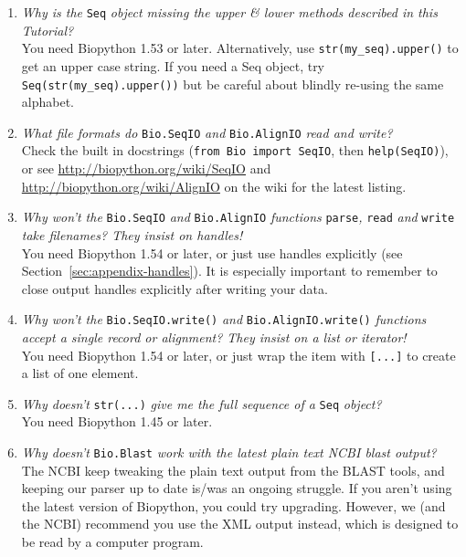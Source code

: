 \begin{enumerate}
  \item \emph{Why is the} \verb|Seq| \emph{object missing the upper \& lower methods described in this Tutorial?} \\
  You need Biopython 1.53 or later.  Alternatively, use \verb|str(my_seq).upper()| to get an upper case string.
  If you need a Seq object, try \verb|Seq(str(my_seq).upper())| but be careful about blindly re-using the same alphabet.

  \item \emph{What file formats do} \verb|Bio.SeqIO| \emph{and} \verb|Bio.AlignIO| \emph{read and write?} \\
  Check the built in docstrings (\texttt{from Bio import SeqIO}, then \texttt{help(SeqIO)}), or see \url{http://biopython.org/wiki/SeqIO} and \url{http://biopython.org/wiki/AlignIO} on the wiki for the latest listing.

  \item \emph{Why won't the } \verb|Bio.SeqIO| \emph{and} \verb|Bio.AlignIO| \emph{functions} \verb|parse|\emph{,} \verb|read| \emph{and} \verb|write| \emph{take filenames? They insist on handles!} \\
  You need Biopython 1.54 or later, or just use handles explicitly (see Section~\ref{sec:appendix-handles}).
  It is especially important to remember to close output handles explicitly after writing your data.

  \item \emph{Why won't the } \verb|Bio.SeqIO.write()| \emph{and} \verb|Bio.AlignIO.write()| \emph{functions accept a single record or alignment? They insist on a list or iterator!} \\
  You need Biopython 1.54 or later, or just wrap the item with \verb|[...]| to create a list of one element.

  \item \emph{Why doesn't} \verb|str(...)| \emph{give me the full sequence of a} \verb|Seq| \emph{object?} \\
  You need Biopython 1.45 or later.

  \item \emph{Why doesn't} \verb|Bio.Blast| \emph{work with the latest plain text NCBI blast output?} \\
  The NCBI keep tweaking the plain text output from the BLAST tools, and keeping our parser up to date is/was an ongoing struggle.
  If you aren't using the latest version of Biopython, you could try upgrading.
  However, we (and the NCBI) recommend you use the XML output instead, which is designed to be read by a computer program.


\end{enumerate}
